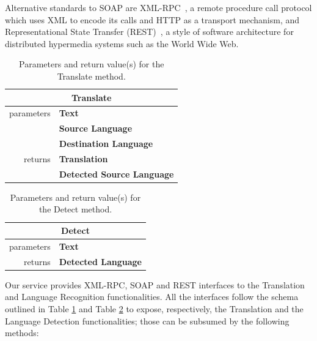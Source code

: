 \documentclass[11pt]{article}
\begin{document}
Alternative standards to SOAP are XML-RPC~\citep{xmlrpcspec}, a remote procedure call protocol which uses XML to encode its calls and HTTP as a transport mechanism, and Representational State Transfer (REST)~\citep{rest}, a style of software architecture for distributed hypermedia systems such as the World Wide Web.

\begin{table}[!ht]
\begin{center}
 \begin{tabular}{|r|l|}
  \hline
  \multicolumn{2}{c}{{\bf Translate}} \\
  \hline \hline
   parameters	& {\bf Text} \\ \cline{2-2}
   				& {\bf Source Language} \\ \cline{2-2}
   				& {\bf Destination Language} \\ %
  \hline \hline
   returns 	& {\bf Translation} \\ \cline{2-2}
   			& {\bf Detected Source Language} \\
  \hline
 \end{tabular}
\end{center}
\caption{Parameters and return value(s) for the Translate method.}
\label{tab:translate}
\end{table}

\begin{table}[!ht]
\begin{center}
 \begin{tabular}{|r|l|}
  \hline
  \multicolumn{2}{c}{{\bf Detect}} \\
  \hline \hline
   parameters	& {\bf Text} \\
  \hline \hline
   returns 	& {\bf Detected Language}\\
  \hline
 \end{tabular}
\end{center}
\caption{Parameters and return value(s) for the Detect method.}
\label{tab:detect}
\end{table}

Our service provides XML-RPC, SOAP and REST interfaces to the Translation and Language Recognition functionalities. All the interfaces follow the schema outlined in Table \ref{tab:translate} and Table \ref{tab:detect} to expose, respectively, the Translation and the Language Detection functionalities; those can be subsumed by the following methods:
\end{document}
